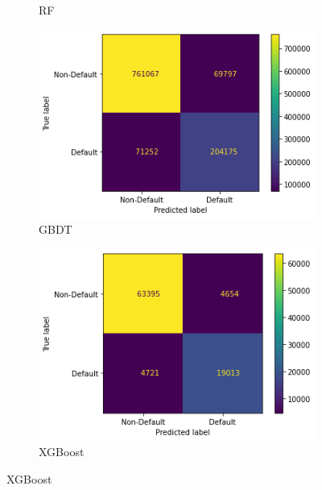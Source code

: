 \documentclass[twoside,11pt,a4paper]{article}
\begin{document}
\begin{figure}[h!]
\begin{subfigure}{0.4 \textwidth}
		\caption[Random Forest]{\acs{RF}}
		\label{fig:cm_rf}
	\end{subfigure}
	\begin{subfigure}{0.4 \textwidth}
		\includegraphics[width=1\linewidth, height=0.8\linewidth]{cm_gbdt}
		\caption[Gradient Boosting Decision Tree]{\acs{GBDT}}
		\label{fig:cm_gbdt}
	\end{subfigure}
	\hfill
	\begin{subfigure}{0.4 \textwidth}
		\includegraphics[width=1\linewidth, height=0.8\linewidth]{cm_xgboost}
		\caption[Xtreme Gradient Boosting Descision Tree]{\acs{XGBoost}}
		\label{fig:cm_xgboost}

\end{subfigure}
\end{figure}
\end{document}

